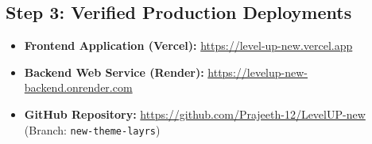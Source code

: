 ﻿\documentclass[11pt,a4paper]{article}
\begin{document}
\subsection{Step 3: Verified Production Deployments}
\begin{itemize}[leftmargin=1.5em]
    \item \textbf{Frontend Application (Vercel):} \href{https://level-up-new.vercel.app}{https://level-up-new.vercel.app}
    \item \textbf{Backend Web Service (Render):} \href{https://levelup-new-backend.onrender.com}{https://levelup-new-backend.onrender.com}
    \item \textbf{GitHub Repository:} \href{https://github.com/Prajeeth-12/LevelUP-new}{https://github.com/Prajeeth-12/LevelUP-new} (Branch: \texttt{new-theme-layrs})
\end{itemize}
\end{document}
